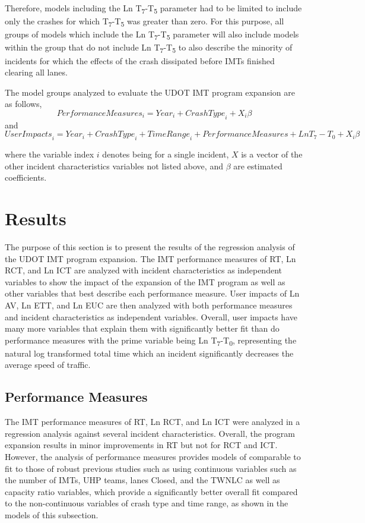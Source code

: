 \documentclass[
  letterpaper,
  authoryear]{elsarticle}
\begin{document}
Therefore, models including the Ln T\textsubscript{7}-T\textsubscript{5}
parameter had to be limited to include only the crashes for which
T\textsubscript{7}-T\textsubscript{5} was greater than zero. For this
purpose, all groups of models which include the Ln
T\textsubscript{7}-T\textsubscript{5} parameter will also include models
within the group that do not include Ln
T\textsubscript{7}-T\textsubscript{5} to also describe the minority of
incidents for which the effects of the crash dissipated before IMTs
finished clearing all lanes.

The model groups analyzed to evaluate the UDOT IMT program expansion are
as follows, \[ 
{Performance Measures}_i = {Year}_i + {Crash Type}_i + X_i\beta
\] and \[ 
{User Impacts}_i = {Year}_i + {CrashType}_i + {TimeRange}_i + PerformanceMeasures + Ln T_7 -T_0 +  X_i\beta
\]

where the variable index \(i\) denotes being for a single incident,
\(X\) is a vector of the other incident characteristics variables not
listed above, and \(\beta\) are estimated coefficients.


\section{Results}\label{results}

The purpose of this section is to present the results of the regression
analysis of the UDOT IMT program expansion. The IMT performance measures
of RT, Ln RCT, and Ln ICT are analyzed with incident characteristics as
independent variables to show the impact of the expansion of the IMT
program as well as other variables that best describe each performance
measure. User impacts of Ln AV, Ln ETT, and Ln EUC are then analyzed
with both performance measures and incident characteristics as
independent variables. Overall, user impacts have many more variables
that explain them with significantly better fit than do performance
measures with the prime variable being Ln
T\textsubscript{7}-T\textsubscript{0}, representing the natural log
transformed total time which an incident significantly decreases the
average speed of traffic.

\subsection{Performance Measures}\label{performance-measures}

The IMT performance measures of RT, Ln RCT, and Ln ICT were analyzed in
a regression analysis against several incident characteristics. Overall,
the program expansion results in minor improvements in RT but not for
RCT and ICT. However, the analysis of performance measures provides
models of comparable to fit to those of robust previous studies such as
\citet{mumtarin_traffic_2023} using continuous variables such as the
number of IMTs, UHP teams, lanes Closed, and the TWNLC as well as
capacity ratio variables, which provide a significantly better overall
fit compared to the non-continuous variables of crash type and time
range, as shown in the models of this subsection.
\end{document}

